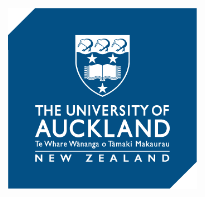 \begin{titlepage}
    \begin{addmargin}[-1cm]{-3cm}
    \begin{center}
        \large

        \hfill

        \vfill

        \begingroup
            \color{CTtitle}\spacedallcaps{\myTitle} \\ \bigskip
        \endgroup
  \vfill
  \vfill
        \vfill

        \includegraphics[width=5cm]{images/frontback/logo.png} \\ \medskip
\vfill
 \vfill
        \mySubtitle \\ \medskip
      \vfill
        \vfill
        \myDepartment \\
        \myFaculty \\
        \myUni \\ \bigskip

        \myTime\  \myVersion

        \vfill

    \end{center}
  \end{addmargin}
\end{titlepage}
